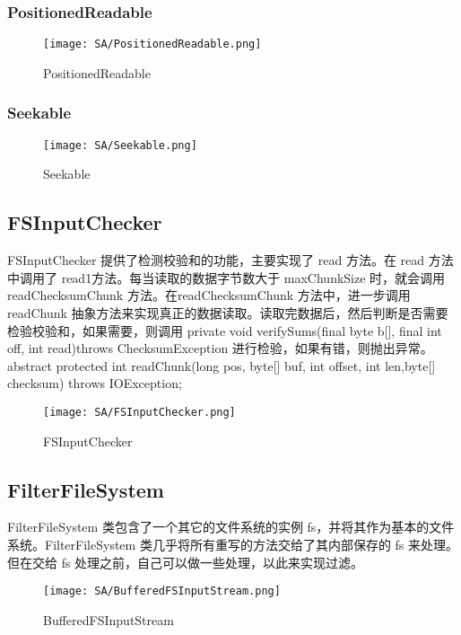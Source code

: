 	\subsubsection{PositionedReadable}
	\begin{figure}[H]
		\centering
		\texttt{[image: SA/PositionedReadable.png]}
		\caption{PositionedReadable}
		\label{fig:graph5}
	\end{figure}
	
	
	 \subsubsection{Seekable}

	\begin{figure}[H]
		\centering
		\texttt{[image: SA/Seekable.png]}
		\caption{Seekable}
		\label{fig:graph6}
	\end{figure}
	
	\subsection{FSInputChecker}
	FSInputChecker 提供了检测校验和的功能，主要实现了 read 方法。在 read 方法中调用了 read1方法。每当读取的数据字节数大于 maxChunkSize 时，就会调用 readChecksumChunk 方法。在readChecksumChunk 方法中，进一步调用 readChunk 抽象方法来实现真正的数据读取。读取完数据后，然后判断是否需要检验校验和，如果需要，则调用 private void verifySums(final byte b[], final int off, int read)throws ChecksumException 进行检验，如果有错，则抛出异常。abstract protected int readChunk(long pos, byte[] buf, int offset, int len,byte[] checksum) throws IOException;
	
	\begin{figure}[H]
		\centering
		\texttt{[image: SA/FSInputChecker.png]}
		\caption{FSInputChecker}
		\label{fig:graph7}
	\end{figure}
	\subsection{FilterFileSystem} 
	FilterFileSystem 类包含了一个其它的文件系统的实例 fs，并将其作为基本的文件系统。FilterFileSystem 类几乎将所有重写的方法交给了其内部保存的 fs 来处理。但在交给 fs 处理之前，自己可以做一些处理，以此来实现过滤。
	\begin{figure}[H]
		\centering
		\texttt{[image: SA/BufferedFSInputStream.png]}
		\caption{BufferedFSInputStream}
		\label{fig:graph8}
	\end{figure}
	
